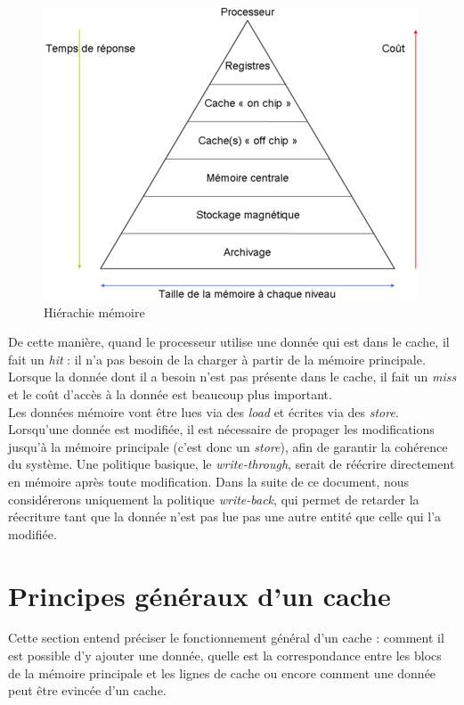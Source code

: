 \begin{figure}[!h]
\begin{center}
   \includegraphics[scale=0.75]{images/hierarchy.png}
   \caption{\label{img:hierarchy} Hiérachie mémoire}
\end{center}
\end{figure}


De cette manière, quand le processeur utilise une donnée qui est dans le cache, il fait un \textit{hit} : il n'a pas besoin de la charger à partir de la mémoire principale. Lorsque la donnée dont il a besoin n'est pas présente dans le cache, il fait un \textit{miss} et le coût d'accès à la donnée est beaucoup plus important. \\

Les données mémoire vont être lues via des \textit{load} et écrites via des \textit{store}. Lorsqu'une donnée est modifiée, il est nécessaire de propager les modifications jusqu'à la mémoire principale (c'est donc un \textit{store}), afin de garantir la cohérence du système. Une politique basique, le \textit{write-through}, serait de réécrire directement en mémoire après toute modification. Dans la suite de ce document, nous considérerons uniquement la politique \textit{write-back}, qui permet de retarder la réecriture tant que la donnée n'est pas lue pas une autre entité que celle qui l'a modifiée.

\section{Principes généraux d'un cache}
Cette section entend préciser le fonctionnement général d'un cache : comment il est possible d'y ajouter une donnée, quelle est la correspondance entre les blocs de la mémoire principale et les lignes de cache ou encore comment une donnée peut être evincée d'un cache. \\

